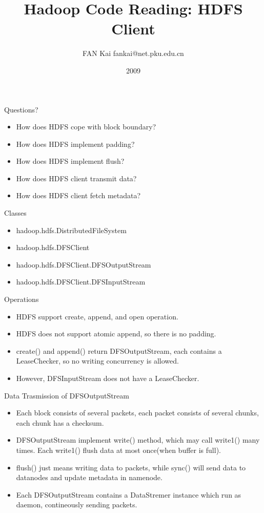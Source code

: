 \documentclass{beamer}
\title{Hadoop Code Reading: HDFS Client}
\author{FAN Kai   fankai@net.pku.edu.cn}
\institute{Computer Networks and Distritued Systems Laboratory\\Peking University}
\date{2009}
\begin{document}
\begin{frame}[label=titlepage]
\titlepage
\end{frame}

\begin{frame} {Questions?}
\begin{itemize}
\item How does HDFS cope with block boundary?
\item How does HDFS implement padding?
\item How does HDFS implement flush?
\item How does HDFS client transmit data?
\item How does HDFS client fetch metadata?
\end{itemize}
\end{frame}

\begin{frame}{Classes}
\begin{itemize}
\item hadoop.hdfs.DistributedFileSystem
\item hadoop.hdfs.DFSClient
\item hadoop.hdfs.DFSClient.DFSOutputStream
\item hadoop.hdfs.DFSClient.DFSInputStream
\end{itemize}
\end{frame}

\begin{frame}{Operations}
\begin{itemize}[<+->]
\item HDFS support create, append, and open operation.
\item HDFS does not support atomic append, so there is no padding.
\item create() and append() return DFSOutputStream, each contains a LeaseChecker, so no writing concurrency is allowed. 
\item However, DFSInputStream does not have a LeaseChecker.
\end{itemize}
\end{frame}

\begin{frame}{Data Trasmission of DFSOutputStream}
\begin{itemize}[<+->]
\item Each block consists of several packets, each packet consists of several chunks, each chunk has a checksum.
\item DFSOutputStream implement write() method, which may call write1() many times. Each write1() flush data at most once(when buffer is full).
\item flush() just means writing data to packets, while sync() will send data to datanodes and update metadata in namenode.
\item Each DFSOutputStream contains a DataStremer instance which run as daemon,  contineously sending packets.
\end{itemize}
\end{frame}
\end{document}
